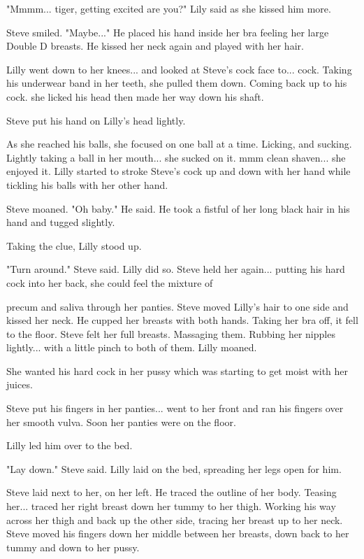 "Mmmm... tiger, getting excited are you?" Lily said as she kissed him more.

Steve smiled. "Maybe..." He placed his hand inside her bra feeling her large Double D breasts. He kissed her neck again and played with her hair.

Lilly went down to her knees... and looked at Steve's cock face to... cock. Taking his underwear band in her teeth, she pulled them down. Coming back up to his cock. she licked his head then made her way down his shaft.

Steve put his hand on Lilly's head lightly.

As she reached his balls, she focused on one ball at a time. Licking, and sucking. Lightly taking a ball in her mouth... she sucked on it. mmm clean shaven... she enjoyed it. Lilly started to stroke Steve's cock up and down with her hand while tickling his balls with her other hand.

Steve moaned. "Oh baby." He said. He took a fistful of her long black hair in his hand and tugged slightly.

Taking the clue, Lilly stood up.

"Turn around." Steve said. Lilly did so. Steve held her again... putting his hard cock into her back, she could feel the mixture of

precum and saliva through her panties. Steve moved Lilly's hair to one side and kissed her neck. He cupped her breasts with both hands. Taking her bra off, it fell to the floor. Steve felt her full breasts. Massaging them. Rubbing her nipples lightly... with a little pinch to both of them. Lilly moaned.

She wanted his hard cock in her pussy which was starting to get moist with her juices.

Steve put his fingers in her panties... went to her front and ran his fingers over her smooth vulva. Soon her panties were on the floor.

Lilly led him over to the bed.

"Lay down." Steve said. Lilly laid on the bed, spreading her legs open for him.

Steve laid next to her, on her left. He traced the outline of her body. Teasing her... traced her right breast down her tummy to her thigh. Working his way across her thigh and back up the other side, tracing her breast up to her neck. Steve moved his fingers down her middle between her breasts, down back to her tummy and down to her pussy.

